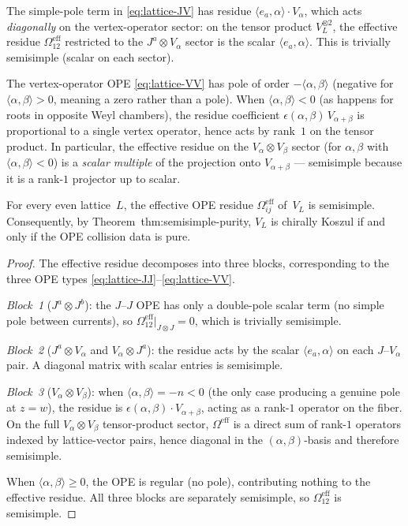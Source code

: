 \documentclass[11pt]{article}
\begin{document}
The simple-pole term in \eqref{eq:lattice-JV} has residue
$\langle e_a, \alpha\rangle \cdot V_\alpha$, which acts
\emph{diagonally} on the vertex-operator sector: on the
tensor product $V_L^{\otimes 2}$, the effective residue
$\Omega_{12}^{\mathrm{eff}}$ restricted to the
$J^a \otimes V_\alpha$ sector is the scalar
$\langle e_a, \alpha\rangle$.  This is trivially semisimple
(scalar on each sector).

The vertex-operator OPE \eqref{eq:lattice-VV} has pole
of order $-\langle\alpha,\beta\rangle$ (negative for
$\langle\alpha,\beta\rangle > 0$, meaning a zero rather
than a pole).  When $\langle\alpha,\beta\rangle < 0$
(as happens for roots in opposite Weyl chambers), the
residue coefficient $\epsilon(\alpha,\beta)\,V_{\alpha+\beta}$
is proportional to a single vertex operator, hence acts by
rank~$1$ on the tensor product.
In particular, the effective residue on the
$V_\alpha \otimes V_\beta$ sector (for $\alpha,\beta$
with $\langle\alpha,\beta\rangle < 0$) is a \emph{scalar
multiple} of the projection onto $V_{\alpha+\beta}$ ---
semisimple because it is a rank-$1$ projector up to scalar.

\begin{proposition}
\label{prop:lattice-semisimple}
For every even lattice~$L$, the effective OPE residue
$\Omega_{ij}^{\mathrm{eff}}$ of~$V_L$ is semisimple.
Consequently, by Theorem~thm:semisimple-purity,
$V_L$ is chirally Koszul if and only if the OPE collision data
is pure.
\end{proposition}

\begin{proof}
The effective residue decomposes into three blocks,
corresponding to the three OPE types
\eqref{eq:lattice-JJ}--\eqref{eq:lattice-VV}.

\emph{Block~1} ($J^a \otimes J^b$):
the $J$--$J$ OPE has only a double-pole scalar term
(no simple pole between currents), so
$\Omega_{12}^{\mathrm{eff}}|_{J \otimes J} = 0$, which
is trivially semisimple.

\emph{Block~2} ($J^a \otimes V_\alpha$ and
$V_\alpha \otimes J^a$):
the residue acts by the scalar
$\langle e_a, \alpha\rangle$
on each $J$--$V_\alpha$ pair.  A diagonal matrix with
scalar entries is semisimple.

\emph{Block~3} ($V_\alpha \otimes V_\beta$):
when $\langle\alpha,\beta\rangle = -n < 0$ (the only case
producing a genuine pole at $z = w$), the residue is
$\epsilon(\alpha,\beta)\cdot V_{\alpha+\beta}$, acting
as a rank-$1$ operator on the fiber.  On the full
$V_\alpha \otimes V_\beta$ tensor-product sector,
$\Omega^{\mathrm{eff}}$ is a direct sum of rank-$1$
operators indexed by lattice-vector pairs, hence diagonal
in the $(\alpha,\beta)$-basis and therefore semisimple.

When $\langle\alpha,\beta\rangle \geq 0$, the OPE is
regular (no pole), contributing nothing to the effective
residue.  All three blocks are separately semisimple, so
$\Omega_{12}^{\mathrm{eff}}$ is semisimple.
\end{proof}
\end{document}
